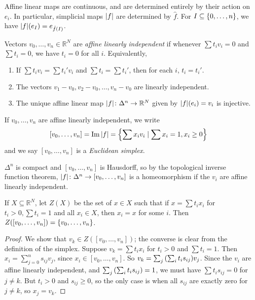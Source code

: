 \begin{remark}
	Affine linear maps are continuous, and are determined entirely by their action on \( e_i \).
	In particular, simplicial maps \( \abs{f} \) are determined by \( \hat f \).
	For \( I \subseteq \qty{0, \dots, n} \), we have \( \abs{f}(e_I) = e_{\hat f(I)} \).
\end{remark}
\begin{definition}
	Vectors \( v_0, \dots, v_n \in \mathbb R^N \) are \emph{affine linearly independent} if whenever \( \sum t_i v_i = 0 \) and \( \sum t_i = 0 \), we have \( t_i = 0 \) for all \( i \).
	Equivalently,
	\begin{enumerate}
		\item If \( \sum t_i v_i = \sum t_i' v_i \) and \( \sum t_i = \sum t_i' \), then for each \( i \), \( t_i = t_i' \).
		\item The vectors \( v_1 - v_0, v_2 - v_0, \dots, v_n - v_0 \) are linearly independent.
		\item The unique affine linear map \( \abs{f} \colon \Delta^n \to \mathbb R^N \) given by \( \abs{f}(e_i) = v_i \) is injective.
	\end{enumerate}
	If \( v_0, \dots, v_n \) are affine linearly independent, we write
	\[ [v_0, \dots, v_n] = \operatorname{Im} \abs{f} = \qty{\sum x_i v_i \mid \sum x_i = 1, x_i \geq 0} \]
	and we say \( [v_0, \dots, v_n] \) is a \emph{Euclidean simplex}.
\end{definition}
\begin{remark}
	\( \Delta^n \) is compact and \( [v_0, \dots, v_n] \) is Hausdorff, so by the topological inverse function theorem, \( \abs{f} \colon \Delta^n \to [v_0, \dots, v_n] \) is a homeomorphism if the \( v_i \) are affine linearly independent.
\end{remark}
\begin{lemma}
	If \( X \subseteq \mathbb R^N \), let \( Z(X) \) be the set of \( x \in X \) such that if \( x = \sum t_i x_i \) for \( t_i > 0, \sum t_i = 1 \) and all \( x_i \in X \), then \( x_i = x \) for some \( i \).
	Then \( Z([v_0, \dots, v_n]) = \qty{v_0, \dots, v_n} \).
\end{lemma}
\begin{proof}
	We show that \( v_k \in Z([v_0, \dots, v_n]) \); the converse is clear from the definition of the simplex.
	Suppose \( v_k = \sum t_i x_i \) for \( t_i > 0 \) and \( \sum t_i = 1 \).
	Then \( x_i = \sum_{j=0}^n s_{ij} v_j \), since \( x_i \in [v_0, \dots, v_n] \).
	So \( v_k = \sum_j \qty(\sum_i t_i s_{ij}) v_j \).
	Since the \( v_i \) are affine linearly independent, and \( \sum_j \qty(\sum_i t_i s_{ij}) = 1 \), we must have \( \sum t_i s_{ij} = 0 \) for \( j \neq k \).
	But \( t_i > 0 \) and \( s_{ij} \geq 0 \), so the only case is when all \( s_{ij} \) are exactly zero for \( j \neq k \), so \( x_j = v_k \).
\end{proof}
